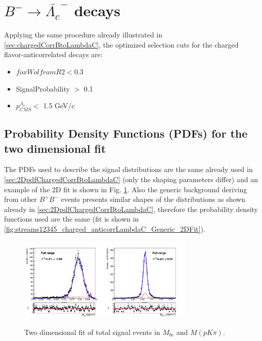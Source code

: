 \section{$B^- \rightarrow \bar{\Lambda_c}^-$ decays}

Applying the same procedure already illustrated in \cref{sec:chargedCorrBtoLambdaC}, the optimized selection cuts for the charged flavor-anticorrelated decays are:

\begin{itemize}
\item $foxWolframR2 < 0.3$  
 \item SignalProbability $> $ 0.1
\item $p^{\Lambda_c}_{CMS} < $ 1.5 GeV/c
\end{itemize}

\subsection{Probability Density Functions (PDFs) for the two dimensional fit}

The PDFs used to describe the signal distributions are the same already used in  \cref{sec:2DpdfChargedCorrBtoLambdaC} (only the shaping parameters differ) and an example of the 2D fit is shown in Fig. \ref{fig:stream12345_TotalSignal_charged_anticorrLambdaC_2Dfit}. Also the generic background deriving from other $B^{+}B^-$ events presents similar shapes of the distributions as shown already in  \cref{sec:2DpdfChargedCorrBtoLambdaC}, therefore the probability density functions used are the same (fit is shown in \cref{fig:streams12345_charged_anticorrLambdaC_Generic_2DFit}).

\begin{figure}[H]
\centering
{\includegraphics[width=0.75\textwidth]{06-chargedAnticorrBtoLambda/figs/stream12345_TotalSignal_charged_anticorrLambdaC_2Dfit.png}}
\caption{Two dimensional fit of total signal events in $M_{bc}$  and $M(p K \pi)$.}
\label{fig:stream12345_TotalSignal_charged_anticorrLambdaC_2Dfit}
\end{figure}

